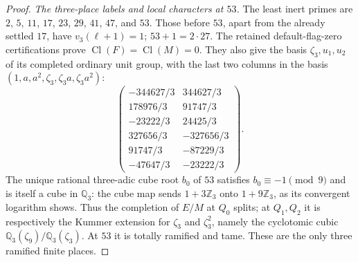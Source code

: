 \begin{proof}
\emph{The three-place labels and local characters at $53$.}
The least inert primes are $2$, $5$, $11$, $17$, $23$,
$29$, $41$, $47$, and $53$.
Those before $53$, apart from the already settled $17$,
have $v_3(\ell+1)=1$; $53+1=2\cdot27$.
The retained default-flag-zero certifications prove
$\operatorname{Cl}(F)=\operatorname{Cl}(M)=0$.
They also give the basis $\zeta_3,u_1,u_2$ of its
completed ordinary unit group, with the last two columns
in the basis $(1,a,a^2,\zeta_3,\zeta_3a,\zeta_3a^2)$:
\[
 \begin{pmatrix}
 -344627/3&344627/3\\
 178976/3&91747/3\\
 -23222/3&24425/3\\
 327656/3&-327656/3\\
 91747/3&-87229/3\\
 -47647/3&-23222/3
 \end{pmatrix}.
 \tag{E116.16}
\]
The unique rational three-adic cube root $b_0$ of $53$
satisfies $b_0\equiv-1\pmod9$ and is itself a cube in
$\mathbb Q_3$: the cube map sends $1+3\mathbb Z_3$
onto $1+9\mathbb Z_3$, as its convergent logarithm shows.
Thus the completion of $E/M$ at $Q_0$ splits; at $Q_1,Q_2$
it is respectively the Kummer extension for $\zeta_3$
and $\zeta_3^2$, namely the cyclotomic cubic
$\mathbb Q_3(\zeta_9)/\mathbb Q_3(\zeta_3)$.
At $53$ it is totally ramified and tame. These are the
only three ramified finite places.


\end{proof}
